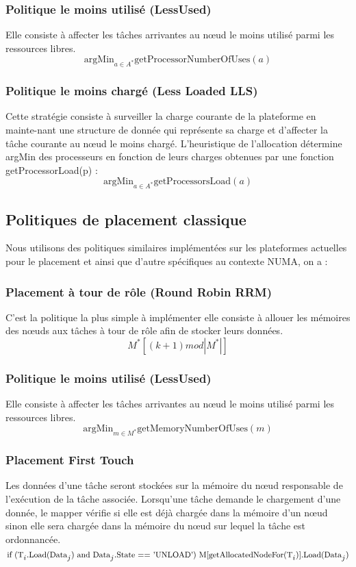 \subsubsection{Politique le moins utilisé (LessUsed)}
%
Elle consiste à affecter les tâches arrivantes au nœud le moins utilisé parmi les ressources libres.
\[
		\text{argMin}_{a \in A^*} \text{getProcessorNumberOfUses}(a)
\]
%
\subsubsection{Politique le moins chargé (Less Loaded LLS)}
%
Cette stratégie consiste à surveiller la charge courante de la plateforme en mainte-nant une structure de donnée qui représente sa charge et d'affecter la tâche courante au nœud le moins chargé. L'heuristique de l'allocation détermine argMin des processeurs en fonction de leurs charges obtenues par une fonction getProcessorLoad(p) : 
\[
		\text{argMin}_{a \in A^*} \text{getProcessorsLoad}(a)
\]
%
\subsection{Politiques de placement classique}
%
Nous utilisons des politiques similaires implémentées sur les plateformes actuelles pour le placement et ainsi que d'autre spécifiques au contexte NUMA, on a  :
%
\subsubsection{Placement à tour de rôle (Round Robin RRM)}
%
C'est la politique la plus simple à implémenter elle consiste à allouer les mémoires des nœuds aux tâches à tour de rôle afin de stocker leurs données.
\[
M^*[(k+1) mod |M^*|]
\]
%
\subsubsection{Politique le moins utilisé (LessUsed)}
%
Elle consiste à affecter les tâches arrivantes au nœud le moins utilisé parmi les ressources libres.
\[
		\text{argMin}_{m \in M^*} \text{getMemoryNumberOfUses}(m)
\]
%
\subsubsection{Placement First Touch}
%
Les données d'une tâche seront stockées sur la mémoire du nœud responsable de l'exécution de la tâche associée. Lorsqu’une tâche demande le chargement d'une donnée, le mapper vérifie si elle est déjà chargée dans la mémoire d'un nœud sinon elle sera chargée dans la mémoire du nœud sur lequel la tâche est ordonnancée.%
\[
{\footnotesize
\text{if (T}_i\text{.Load(Data}_j\text{) and Data}_j\text{.State == 'UNLOAD') M[getAllocatedNodeFor(T}_i\text{)].Load(Data}_j\text{)}
}
\]
%
